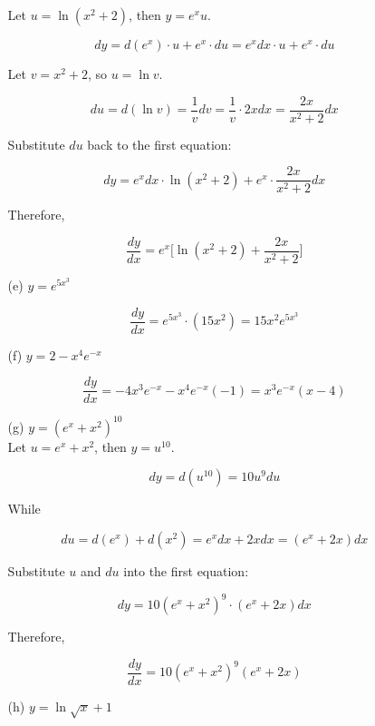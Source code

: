 \documentclass{article}
\begin{document}
\begin{enumerate}
\begin{enumerate}
            Let $ u = \ln{ (x^2 + 2) } $, then $ y = e^x u $. 
            
            $$ dy = d(e^x) \cdot u + e^x \cdot du = e^x dx \cdot u + e^x \cdot du $$
            
            Let $ v = x^2 + 2 $, so $ u = \ln{v} $.
            
            $$ du = d(\ln{v}) = \frac{1}{v} dv = \frac{1}{v} \cdot 2xdx = \frac{2x}{x^2+2}dx $$
            
            Substitute $du$ back to the first equation:
            
            $$ dy = e^x dx \cdot \ln{ (x^2+2) } + e^x \cdot \frac{2x}{x^2+2}dx $$
            
            Therefore,
            
            $$ \frac{dy}{dx} = e^x \Big[ \ln{ (x^2+2) } + \frac{2x}{x^2 + 2} \Big] $$
            
            \item[(e)] $ y = e^{ 5x^3 } $
            
            $$ \frac{dy}{dx} = e^{ 5x^3 } \cdot (15x^2) = 15x^2 e^{ 5x^3 } $$
            
            \item[(f)] $ y = 2 - x^4e^{-x} $
            
            $$ \frac{dy}{dx} = -4x^3 e^{-x} - x^4 e^{-x} (-1) = x^3e^{-x}(x - 4) $$
            
            \item[(g)] $ y = (e^x + x^2)^{10} $ \\
            
            Let $ u = e^x + x^2 $, then $ y = u^{10} $.
            
            $$ dy = d(u^{10}) = 10u^9du $$
            
            While
            
            $$ du = d(e^x) + d(x^2) = e^x dx + 2x dx = (e^x + 2x) dx $$
            
            Substitute $u$ and $du$ into the first equation:
            
            $$ dy = 10(e^x + x^2)^9 \cdot (e^x + 2x) dx $$
            
            Therefore,
            
            $$ \frac{dy}{dx} = 10(e^x + x^2)^9 (e^x + 2x) $$
            
            \item[(h)] $ y = \ln{ \sqrt{x} + 1 } $
                

\end{enumerate}
\end{enumerate}
\end{document}
